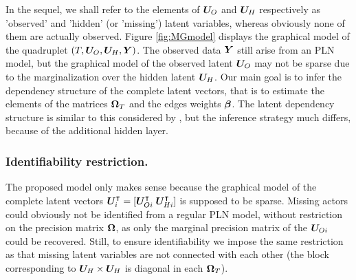 In the sequel, we shall refer to the elements of ${\boldsymbol{U}}_O$ and ${\boldsymbol{U}}_H$ respectively as 'observed' and 'hidden' (or 'missing') latent variables, whereas obviously none of them are actually observed. Figure \ref{fig:MGmodel} displays the graphical model of the quadruplet $(T, {\boldsymbol{U}}_O, {\boldsymbol{U}}_H, {\boldsymbol{Y}})$. The observed data ${\boldsymbol{Y}}$ still arise from an PLN model, but the graphical model of the observed latent ${\boldsymbol{U}}_O$ may not be sparse due to the marginalization over the hidden latent ${\boldsymbol{U}}_H$. Our main goal is to infer the dependency structure of the complete latent vectors, that is to estimate the elements of the matrices ${\boldsymbol{\Omega}}_T$ and the edges weights ${\boldsymbol{\beta}}$. The latent dependency structure is similar to this considered by \cite{RAR19}, but the inference strategy much differs, because of the additional hidden layer.

\subsubsection*{Identifiability restriction.} 
The proposed model only makes sense because the graphical model of the complete latent vectors ${\boldsymbol{U}}_i^\intercal = [{\boldsymbol{U}}_{Oi}^\intercal \; {\boldsymbol{U}}_{Hi}^\intercal]$ is supposed to be sparse. Missing actors could obviously not be identified from a regular PLN model, without restriction on the precision matrix ${\boldsymbol{\Omega}}$, as only the marginal precision matrix of the ${\boldsymbol{U}}_{Oi}$ could be recovered. Still, to ensure identifiability we impose the same restriction as \cite{RAR19} that  missing latent variables are not connected with each other (the block corresponding to ${\boldsymbol{U}}_H \times {\boldsymbol{U}}_H$ is diagonal in each ${\boldsymbol{\Omega}}_{T}$).
 
